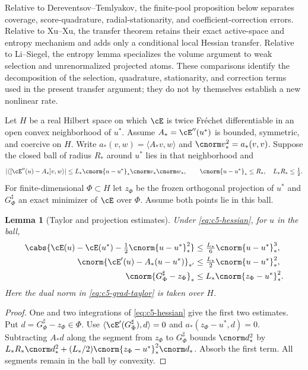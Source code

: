 \documentclass[11pt]{article}
\newtheorem{lemma}[theorem]{Lemma}
\theoremstyle{remark}
\begin{document}
Relative to Dereventsov--Temlyakov, the finite-pool proposition below
separates coverage, score-quadrature, radial-stationarity, and
coefficient-correction errors. Relative to Xu--Xu, the transfer theorem
retains their exact active-space and entropy mechanism and adds only a
conditional local Hessian transfer. Relative to Li--Siegel, the entropy
lemma specializes the volume argument to weak selection and unrenormalized
projected atoms. These comparisons identify the decomposition of the selection,
quadrature, stationarity, and correction terms used in the present transfer argument;
they do not by themselves establish a new nonlinear rate.

Let $H$ be a real Hilbert space on which $\cE$ is twice Fr\'echet
differentiable in an open convex neighborhood of $u^*$.
Assume $A_*=\cE''(u^*)$ is bounded, symmetric, and coercive on $H$.
Write $a_*(v,w)=\langle A_*v,w\rangle$ and $\cnorm v_*^2=a_*(v,v)$.
Suppose the closed ball of radius $R_*$ around $u^*$ lies in that
neighborhood and
\begin{equation}
 |\langle[\cE''(u)-A_*]v,w\rangle|
 \leq L_*\cnorm{u-u^*}_*\cnorm v_*\cnorm w_*,
 \qquad \cnorm{u-u^*}_*\leq R_*,\quad L_*R_*\leq\tfrac12 .
 \label{eq:c5-hessian}
\end{equation}
For finite-dimensional $\Phi\subset H$ let $z_\Phi$ be the frozen
orthogonal projection of $u^*$ and $G_\Phi^\sharp$ an exact minimizer
of $\cE$ over $\Phi$. Assume both points lie in this ball.

\begin{lemma}[Taylor and projection estimates]
\label{lem:c5-projection}
Under \eqref{eq:c5-hessian}, for $u$ in the ball,
\begin{align}
 \cabs{\cE(u)-\cE(u^*)-\tfrac12\cnorm{u-u^*}_*^2}
 &\leq\tfrac{L_*}{6}\cnorm{u-u^*}_*^3,\label{eq:c5-taylor}\\
 \cnorm{\cE'(u)-A_*(u-u^*)}_{*'}
 &\leq\tfrac{L_*}{2}\cnorm{u-u^*}_*^2,\label{eq:c5-grad-taylor}\\
 \cnorm{G_\Phi^\sharp-z_\Phi}_*
 &\leq L_*\cnorm{z_\Phi-u^*}_*^2.\label{eq:c5-proj}
\end{align}
Here the dual norm in \eqref{eq:c5-grad-taylor} is taken over $H$.
\end{lemma}
\begin{proof}
One and two integrations of \eqref{eq:c5-hessian} give the first
two estimates. Put $d=G_\Phi^\sharp-z_\Phi\in\Phi$.
Use $\langle\cE'(G_\Phi^\sharp),d\rangle=0$ and
$a_*(z_\Phi-u^*,d)=0$. Subtracting $A_*d$ along the segment from
$z_\Phi$ to $G_\Phi^\sharp$ bounds
$\cnorm d_*^2$ by
$L_*R_*\cnorm d_*^2+(L_*/2)\cnorm{z_\Phi-u^*}_*^2\cnorm d_*$.
Absorb the first term. All segments remain in the ball by convexity.
\end{proof}
\end{document}
